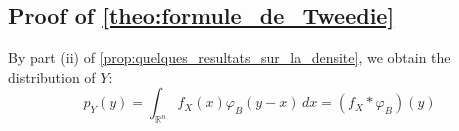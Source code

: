 \documentclass[a4paper,10pt]{article}
\theoremstyle{definition} %
\theoremstyle{definition} %
\theoremstyle{definition} %
\theoremstyle{definition} %
\newcommand{\0}{\boldsymbol{0}}
\begin{document}









\subsection{Proof of \cref{theo:formule_de_Tweedie}}\label{sec:proof_formule_de_Tweedie}
By part (ii) of \cref{prop:quelques_resultats_sur_la_densite}, we obtain the distribution of $Y$:
\begin{equation*}
p_Y(y) = \int_{\mathbb{R}^n} f_X(x) \varphi_B(y - x) \, dx = (f_X * \varphi_B)(y)
\end{equation*}
\end{document}
